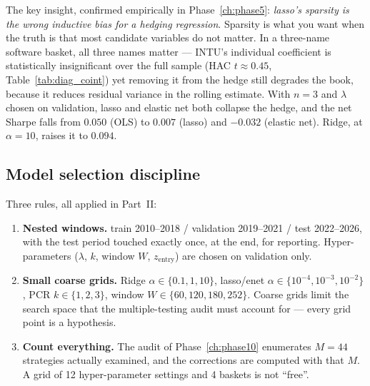The key insight, confirmed empirically in Phase~\ref{ch:phase5}: \emph{lasso's sparsity
is the wrong inductive bias for a hedging regression}. Sparsity is what you want when the
truth is that most candidate variables do not matter. In a three-name software basket, all
three names matter --- INTU's individual coefficient is statistically insignificant over
the full sample (HAC $t\approx0.45$, Table~\ref{tab:diag_coint}) yet removing it from the
hedge still degrades the book, because it reduces residual variance in the rolling
estimate. With $n=3$ and $\lambda$ chosen on validation, lasso and elastic net both
collapse the hedge, and the net Sharpe falls from $0.050$ (OLS) to $0.007$ (lasso) and
$-0.032$ (elastic net). Ridge, at $\alpha=10$, raises it to $0.094$.

\subsection{Model selection discipline}
\label{sec:reg:selection}

Three rules, all applied in Part~II:
\begin{enumerate}
  \item \textbf{Nested windows.} train 2010--2018 / validation 2019--2021 / test
    2022--2026, with the test period touched exactly once, at the end, for reporting.
    Hyper-parameters ($\lambda$, $k$, window $W$, $z_{\text{entry}}$) are chosen on
    validation only.
  \item \textbf{Small coarse grids.} Ridge $\alpha\in\{0.1,1,10\}$, lasso/enet
    $\alpha\in\{10^{-4},10^{-3},10^{-2}\}$, PCR $k\in\{1,2,3\}$, window
    $W\in\{60,120,180,252\}$. Coarse grids limit the search space that the
    multiple-testing audit must account for --- every grid point is a hypothesis.
  \item \textbf{Count everything.} The audit of Phase~\ref{ch:phase10} enumerates
    $M=44$ strategies actually examined, and the corrections are computed with that $M$.
    A grid of 12 hyper-parameter settings and 4 baskets is not ``free''.
\end{enumerate}
